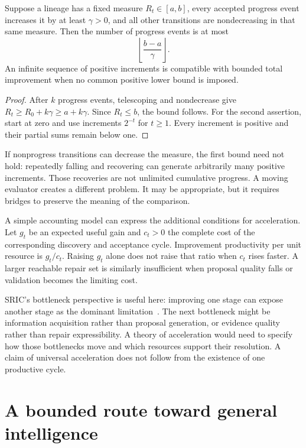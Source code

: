 \begin{SIIproposition}\label{SII:prop:ceiling}
Suppose a lineage has a fixed measure $R_t\in[a,b]$, every accepted progress event increases it by at least $\gamma>0$, and all other transitions are nondecreasing in that same measure. Then the number of progress events is at most
\[
\left\lfloor\frac{b-a}{\gamma}\right\rfloor.
\]
An infinite sequence of positive increments is compatible with bounded total improvement when no common positive lower bound is imposed.
\end{SIIproposition}
\begin{proof}
After $k$ progress events, telescoping and nondecrease give $R_t\geq R_0+k\gamma\geq a+k\gamma$. Since $R_t\leq b$, the bound follows. For the second assertion, start at zero and use increments $2^{-t}$ for $t\geq1$. Every increment is positive and their partial sums remain below one.
\end{proof}

If nonprogress transitions can decrease the measure, the first bound need not hold: repeatedly falling and recovering can generate arbitrarily many positive increments. Those recoveries are not unlimited cumulative progress. A moving evaluator creates a different problem. It may be appropriate, but it requires bridges to preserve the meaning of the comparison.

A simple accounting model can express the additional conditions for acceleration. Let $g_t$ be an expected useful gain and $c_t>0$ the complete cost of the corresponding discovery and acceptance cycle. Improvement productivity per unit resource is $g_t/c_t$. Raising $g_t$ alone does not raise that ratio when $c_t$ rises faster. A larger reachable repair set is similarly insufficient when proposal quality falls or validation becomes the limiting cost.

SRIC's bottleneck perspective is useful here: improving one stage can expose another stage as the dominant limitation~\cite{SII:sric}. The next bottleneck might be information acquisition rather than proposal generation, or evidence quality rather than repair expressibility. A theory of acceleration would need to specify how those bottlenecks move and which resources support their resolution. A claim of universal acceleration does not follow from the existence of one productive cycle.



\chapter{A bounded route toward general intelligence}\label{SII:book:chapter-66}
\label{SII:part:architecture}
